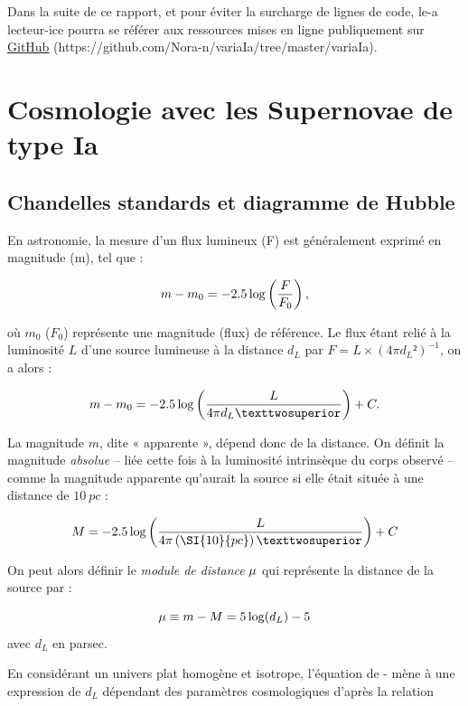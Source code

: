 \documentclass[a4paper, 12pt, svgnames]{article}
\begin{document}
Dans la suite de ce rapport, et pour éviter la surcharge de lignes de code, le-a
lecteur-ice pourra se référer aux ressources mises en ligne publiquement sur
\href{https://github.com/Nora-n/variaIa/tree/master/variaIa}{GitHub}
(https://github.com/Nora-n/variaIa/tree/master/variaIa).


\section{Cosmologie avec les Supernovae de type Ia}\label{sec:cosmo}
\subsection{Chandelles standards et diagramme de Hubble}\label{ssec:hub}

En astronomie, la mesure d'un flux lumineux (F) est généralement exprimé en
magnitude (m), tel que :

\begin{equation}
    m - m_0 = -2.5\log\left(\frac{F}{F_0}\right),
\end{equation}

où $m_0$ ($F_0$) représente une magnitude (flux) de référence.
Le flux étant relié à la luminosité $L$ d'une source lumineuse à la distance
$d_L$ par $F = L\times \left(4\pi d_L²\right)^{-1}$, on a alors :

\begin{equation}
    m - m_0 = -2.5\log\LR{L}{4\pi d_L²} + C.
\end{equation}

La magnitude $m$, dite « apparente », dépend donc de la distance. On définit
la magnitude \textit{absolue} -- liée cette fois à la luminosité intrinsèque du
corps observé -- comme la magnitude apparente qu'aurait la source si elle était
située à une distance de $\SI{10}{pc}$ :

\begin{equation}
    M = -2.5\log\LR{L}{4\pi\LF{\SI{10}{pc}}²} + C
\end{equation}

On peut alors définir le \textit{module de distance} $\mu$ qui représente la
distance de la source par :

\begin{equation}
    \mu \equiv m - M = 5\log(d_L) - 5
\end{equation}
avec $d_L$ en parsec. 

En considérant un univers plat homogène et isotrope, l'équation de
- mène à une expression de $d_L$ dépendant des
paramètres cosmologiques d'après la relation
\end{document}
